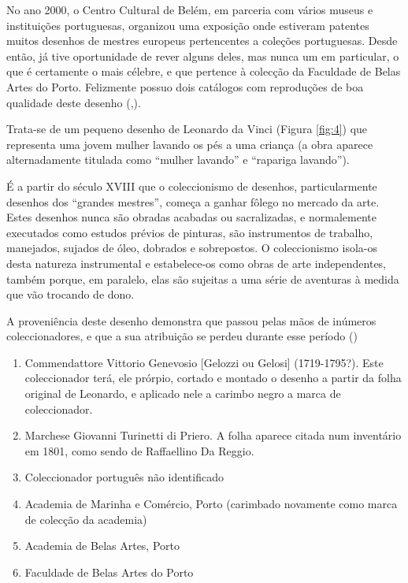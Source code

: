 \documentclass{article}
\begin{document}
No ano 2000, o Centro Cultural de Belém, em parceria com vários museus
e instituições portuguesas, organizou uma exposição onde estiveram
patentes muitos desenhos de mestres europeus pertencentes a coleções
portuguesas. Desde então, já tive oportunidade de rever alguns deles,
mas nunca um em particular, o que é certamente o mais célebre, e que
pertence à colecção da Faculdade de Belas Artes do Porto. Felizmente
possuo dois catálogos com reproduções de boa qualidade deste desenho
(\cite{desenhos-europeus},\cite{desenhos-porto}).

Trata-se de um pequeno desenho de Leonardo da Vinci (Figura
\ref{fig:4}) que representa uma jovem mulher lavando os pés a uma
criança (a obra aparece alternadamente titulada como ``mulher
lavando'' e ``rapariga lavando'').

É a partir do século XVIII que o coleccionismo de desenhos,
particularmente desenhos dos ``grandes mestres'', começa a ganhar
fôlego no mercado da arte. Estes desenhos nunca são obradas acabadas
ou sacralizadas, e normalemente executados como estudos prévios de
pinturas, são instrumentos de trabalho, manejados, sujados de óleo,
dobrados e sobrepostos. O coleccionismo isola-os desta natureza
instrumental e estabelece-os como obras de arte independentes, também
porque, em paralelo, elas são sujeitas a uma série de aventuras à
medida que vão trocando de dono.

A proveniência deste desenho demonstra que passou pelas mãos de
inúmeros coleccionadores, e que a sua atribuição se perdeu durante
esse período (\cite{desenhos-europeus})
\begin{enumerate}
\item Commendattore Vittorio Genevosio [Gelozzi ou Gelosi]
  (1719-1795?). Este coleccionador terá, ele prórpio, cortado e
  montado o desenho a partir da folha original de Leonardo, e aplicado
  nele a carimbo negro a marca de coleccionador.
  \item Marchese Giovanni Turinetti di Priero. A folha aparece citada
    num inventário em 1801, como sendo de Raffaellino Da Reggio.
  \item Coleccionador português não identificado
  \item Academia de Marinha e Comércio, Porto (carimbado novamente
    como marca de colecção da academia)
  \item Academia de Belas Artes, Porto
  \item Faculdade de Belas Artes do Porto
\end{enumerate}
\end{document}

